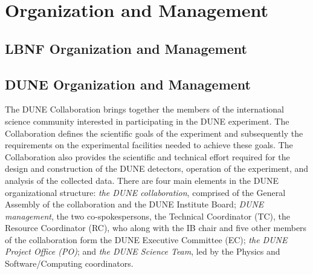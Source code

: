 
\chapter{Organization and Management}
\label{v1ch:org-mgmt}


\section{LBNF Organization and Management}

\section{DUNE Organization and Management}

%

The DUNE Collaboration brings together the members of the international science community 
interested in participating in the DUNE experiment.  The Collaboration defines the scientific goals of the experiment and subsequently 
the requirements on the experimental facilities needed to achieve these goals.  The Collaboration also provides the scientific and 
technical effort required for the design and construction of the DUNE detectors, operation of the experiment, and analysis of the 
collected data. There are four main elements in the DUNE organizational structure:  
{\it the DUNE collaboration}, comprised of the General Assembly of the collaboration and the DUNE Institute Board;     
{\it DUNE management}, the two co-spokespersons, the Technical Coordinator (TC), the Resource Coordinator (RC), who along
  with the IB chair and five other members of the collaboration form the DUNE Executive Committee (EC); 
{\it the DUNE Project Office (PO)}; and
{\it the DUNE Science Team}, led by the Physics and Software/Computing coordinators. 

